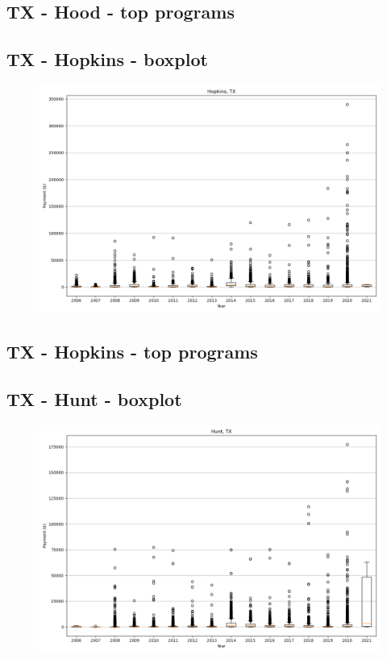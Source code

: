 \subsection*{TX - Hood - top programs}

\newpage
\subsection*{TX - Hopkins - boxplot}
\begin{figure}[h]
\centering
\includegraphics[width=7in]{../output/boxplots/counties/Hopkins-TX_boxplot.png}
\end{figure}


\subsection*{TX - Hopkins - top programs}

\newpage
\subsection*{TX - Hunt - boxplot}
\begin{figure}[h]
\centering
\includegraphics[width=7in]{../output/boxplots/counties/Hunt-TX_boxplot.png}
\end{figure}


